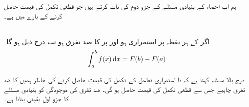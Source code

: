 ہم اب احصاء کے بنیادی مسئلے کے  جزو دوم کی بات کرتے ہیں جو قطعی تکمل کی قیمت حاصل کرنے کے بارے میں ہے۔

\\
اگر  کے ہر نقطہ پر  استمراری ہو اور  پر  کا ضد تفرق  ہو تب درج ذیل ہو گا۔
\begin{align}\label{مساوات_تکمل_بنیادی_مسئلہ_جزو_دوم_الف}
\int_a^bf(x)\dif x=F(b)-F(a)
\end{align} 

درج بالا مسئلہ کہتا ہے کہ  تا  استمراری تفاعل  کے تکمل کی قیمت حاصل کرنے کی خاطر ہمیں  کا ضد تفرق  چاہیے  جس سے قطعی تکمل کی قیمت  حاصل ہو گی۔ ضد تفرق کی موجودگی کو بنیادی مسئلے کا جزو اول یقینی بناتا ہے۔

